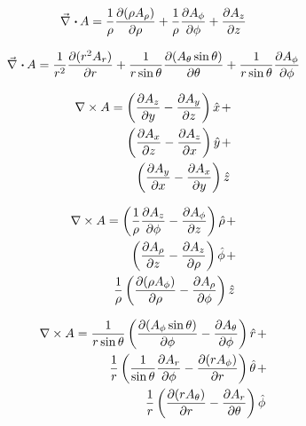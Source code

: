 \documentclass[a4paper,10pt]{article}
\begin{document}
\begin{multicols}{2}
  \begin{equation*}
    \div A = \frac{1}{\rho} \dep{(\rho A_\rho)}{\rho} +
    \frac{1}{\rho} \dep{A_\phi}{\phi} +
    \dep{A_z}{z}
  \end{equation*}
  
  \begin{equation*}
    \div A = \frac{1}{r^2} \dep{(r^2 A_r)}{r} +
    \frac{1}{r \sin \theta} \dep{(A_\theta \sin\theta)}{\theta} +
    \frac{1}{r \sin\theta} \dep{A_\phi}{\phi}
  \end{equation*}

\begin{align*}
  \rot A = \lrb{\dep{A_z}{y} - \dep{A_y}{z}} \hat{x} + \\
  \lrb{\dep{A_x}{z} - \dep{A_z}{x}} \hat{y} + \\
  \lrb{\dep{A_y}{x} - \dep{A_x}{y}} \hat{z}
\end{align*}

\begin{align*}
  \rot A = \lrb{\frac{1}{\rho} \dep{A_z}{\phi} - \dep{A_\phi}{z}} \hat{\rho} + \\
  \lrb{\dep{A_\rho}{z} - \dep{A_z}{\rho}} \hat{\phi} + \\
  \frac{1}{\rho} \lrb{\dep{(\rho A_\phi)}{\rho} - \dep{A_\rho}{\phi}} \hat{z}
\end{align*}

\begin{align*}
  \rot A = \frac{1}{r \sin\theta} \lrb{\dep{(A_\phi \sin\theta)}{\phi} - \dep{A_\theta}{\phi}} \hat{r} + \\
  \frac{1}{r} \lrb{\frac{1}{\sin\theta} \dep{A_r}{\phi} - \dep{(r A_\phi)}{r}} \hat{\theta} + \\
  \frac{1}{r} \lrb{\dep{(r A_\theta)}{r} - \dep{A_r}{\theta}} \hat{\phi}
\end{align*}
\end{multicols}
\end{document}
